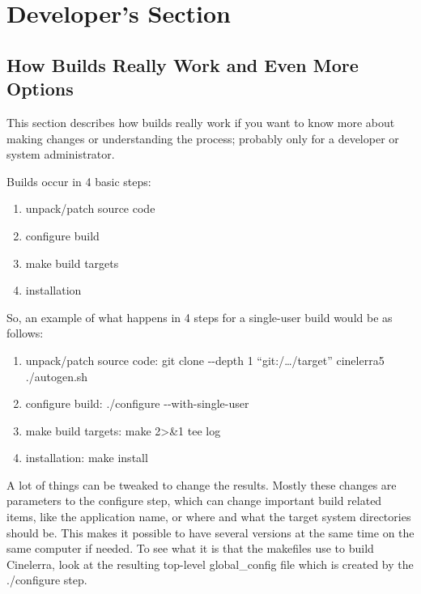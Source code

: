 \chapter{Developer's Section}%
\label{cha:developer_section}

\section{How Builds Really Work and Even More Options}
\label{sec:How Builds Really Work and Even More Options}

This section describes how builds really work if you want to know more about making changes or understanding the process; probably only for a developer or system administrator.
\medskip

Builds occur in 4 basic steps:
\smallskip
\begin{enumerate}[nosep]
	\item unpack/patch source code
	\item configure build
	\item make build targets
	\item installation
\end{enumerate}

So, an example of what happens in 4 steps for a single-user build would be as follows:
\smallskip

\begin{enumerate}[nosep]
	\item unpack/patch source code:\newline
	git clone -{}-depth 1 ``git:/{\dots}/target'' cinelerra5\newline
	./autogen.sh
	\item configure build:\newline
	./configure -{}-with-single-user
	\item make build targets:\newline
	make 2>\&1 {\textbar} tee log
	\item installation:\newline
	make install
\end{enumerate}
\medskip

A lot of things can be tweaked to change the results. Mostly these changes are parameters to the configure step, which can change important build related items, like the application name, or where and what the target system directories should be. This makes it possible to have several versions at the same time on the same computer if needed. To see what it is that the makefiles use to build Cinelerra, look at the resulting top-level global\_config file which is created by the ./configure step.
\medskip

